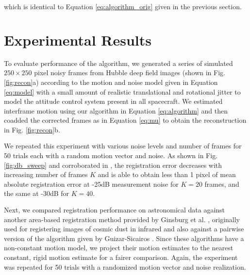 \documentclass{article}
\newcommand{\new}[1]{{\color{green}#1}}
\begin{document}
which is identical to Equation \ref{eq:algorithm_orig} given in the previous section.

\section{Experimental Results}
\label{sec:results}

To evaluate performance of the algorithm, we generated a series of simulated $250\times250$ pixel noisy frames from Hubble deep field images (shown in Fig. \ref{fig:recon}a) according to the motion and noise model given in Equation \ref{eq:model} with a small amount of realistic translational and rotational jitter to model the attitude control system present in all spacecraft. We estimated interframe motion using our algorithm in Equation \ref{eq:algorithm} and then coadded the corrected frames as in Equation \ref{eq:mu} to obtain the reconstruction in Fig. \ref{fig:recon}b.

We repeated this experiment with various noise levels and number of frames for 50 trials each with a random motion vector and noise.  As shown in Fig. \ref{fig:db_sweep} and corroborated in \cite{gratadour2005sub}, the registration error decreases with increasing number of frames $K$ and is able to obtain less than 1 pixel of mean absolute registration error at -25dB measurement noise for $K=20$ frames, and the same at -30dB for $K=40$.


Next, we compared registration performance on astronomical data against another area-based registration method provided by Ginsburg et al. \cite{ginsburg2013bolocam}, originally used for registering images of cosmic dust in infrared and also against a pairwise version of the algorithm given by Guizar-Sicairos \cite{guizar2008efficient}.  Since these algorithms have a non-constant motion model, we project their motion estimates to the nearest constant, rigid motion estimate for a fairer comparison.  Again, the experiment was repeated for 50 trials with a randomized motion vector and noise realization.
\end{document}

